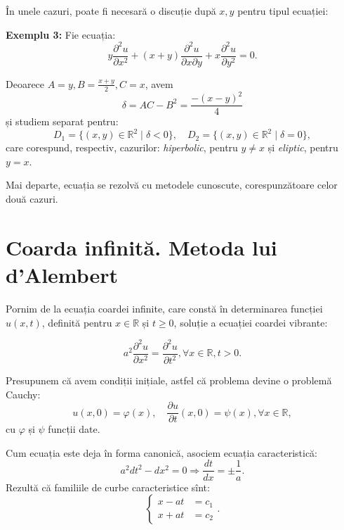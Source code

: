 \documentclass[11pt,a4paper]{article}
\newcommand\RR{\mathbb{R}}
\theoremstyle{dotless}
\theoremstyle{dotlessdr}
\begin{document}
\vspace{1cm}

În unele cazuri, poate fi necesară o discuție după $ x, y $ pentru tipul ecuației:

\textbf{Exemplu 3:} Fie ecuația:
\[
  y \frac{\partial^2 u}{\partial x^2} + (x + y) \frac{\partial^2 u}{\partial x\partial y} + %
  x \frac{\partial^2 u}{\partial y^2} = 0.
\]

Deoarece $ A = y, B = \frac{x + y}{2}, C = x $, avem
\[
  \delta = AC - B^2 = \frac{-(x - y)^2}{4}
\]
și studiem separat pentru:
\[
  D_1 = \{(x, y) \in \RR^2 \mid \delta < 0 \}, \quad %
  D_2 = \{(x, y) \in \RR^2 \mid \delta = 0 \},
\]
care corespund, respectiv, cazurilor: \emph{hiperbolic}, pentru $ y \neq x $ și
\emph{eliptic}, pentru $ y = x $.

Mai departe, ecuația se rezolvă cu metodele cunoscute, corespunzătoare celor
două cazuri.




\section{Coarda infinită. Metoda lui d'Alembert}

\indent\indent Pornim de la ecuația coardei infinite, care constă în determinarea funcției
$ u(x, t) $, definită pentru $ x \in \RR $ și $ t \geq 0 $, soluție a ecuației
coardei vibrante:

\[
  a^2 \frac{\partial^2 u}{\partial x^2} = \frac{\partial^2 u}{\partial t^2}, %
  \forall x \in \RR, t > 0.
\]

Presupunem că avem condiții inițiale, astfel că problema devine o problemă Cauchy:
\[
  u(x, 0) = \varphi(x), \quad \frac{\partial u}{\partial t}(x, 0) = \psi(x), \forall x \in \RR,
\]
cu $ \varphi $ și $ \psi $ funcții date.

Cum ecuația este deja în forma canonică, asociem ecuația caracteristică:
\[
  a^2 dt^2 - dx^2 = 0 \Rightarrow \frac{dt}{dx} = \pm\frac{1}{a}.
\]
Rezultă că familiile de curbe caracteristice sînt:
\[
  \begin{cases}
    x - at &= c_1 \\
    x + at &= c_2
  \end{cases}.
\]
\end{document}
